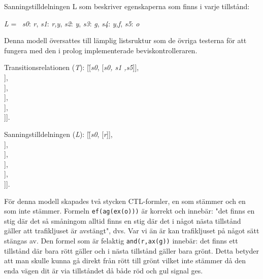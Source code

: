 Sanningstilldelningen L som beskriver egenskaperna som finns i varje tillstånd:
\begin{tabbing}
\textit{L} = \textbraceleft\
\textit{s0}:\textbraceleft
\textit{r}\textbraceright, 
\textit{s1}:\textbraceleft 
\textit{r,y}\textbraceright, 
\textit{s2}:\textbraceleft 
\textit{y}\textbraceright, 
\textit{s3}:\textbraceleft 
\textit{g}\textbraceright, 
\textit{s4}:\textbraceleft 
\textit{y,f}\textbraceright, 
\textit{s5}:\textbraceleft 
\textit{o}\textbraceright\ \textbraceright
\end{tabbing}

Denna modell översattes till lämplig listsruktur som de övriga testerna för att fungera med den i prolog implementerade beviskontrolleraren.
\begin{tabbing}
Transitionsrelationen (\textit{T}):
[\=[\textit{s0}, [\textit{s0, s1 ,s5}]],\\
\>[\textit{s1}, [\textit{s0, s3, s5}]],\\
\>[\textit{s2}, [\textit{s0, s1, s3, s5}]],\\
\>[\textit{s3}, [\textit{s3, s2, s5}]],\\
\>[\textit{s4}, [\textit{s4, s5}]],\\
\>[\textit{s5}, [\textit{s5, s0, s4, s5}]]].\\
\end{tabbing}

\begin{tabbing}
Sanningstilldelningen (\textit{L}):
[\=[\textit{s0}, [\textit{r}]],\\
\>[\textit{s1}, [\textit{r,y}]],\\
\>[\textit{s2}, [\textit{y}]],\\
\>[\textit{s3}, [\textit{g}]],\\
\>[\textit{s4}, [\textit{y,f}]],\\
\>[\textit{s5}, [\textit{o}]]].\\
\end{tabbing}

För denna modell skapades två stycken CTL-formler, en som stämmer och en som inte stämmer.
Formeln \texttt{ef(ag(ex(o)))} är korrekt och innebär: "det finns en stig där det så småningom alltid finns en stig där det i något nästa tillstånd gäller att trafikljuset är avstängt", dvs. Var vi än är kan trafikljuset på något sätt stängas av. Den formel som är felaktig \texttt{and(r,ax(g))} innebär: det finns ett tillstånd där bara rött gäller och i nästa tillstånd gäller bara grönt. Detta betyder att man skulle kunna gå direkt från rött till grönt vilket inte stämmer då den enda vägen dit är via tillståndet då både röd och gul signal ges.